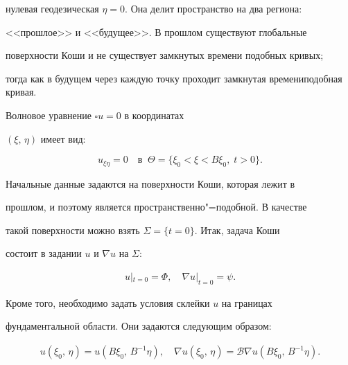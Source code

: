 нулевая геодезическая $\eta=0$. Она делит пространство на два региона:

<<прошлое>> и <<будущее>>. В прошлом существуют глобальные

поверхности Коши и не существует замкнутых времени подобных кривых;

тогда как в будущем через каждую точку проходит замкнутая времениподобная кривая.



Волновое уравнение $\square u = 0$ в координатах

$(\xi,\,\eta)$ имеет вид:

\begin{equation}

\label{gro:eq}

 u_{\xi \eta} = 0 \quad \text{в}\;\; \Theta = \{ \xi_0 < \xi

< B \xi_0,\; t > 0\}.

\end{equation}



Начальные данные задаются на поверхности Коши, которая лежит в

прошлом, и поэтому является пространственно"=подобной. В качестве

такой поверхности можно взять $\Sigma = \{t=0\}$. Итак, задача Коши

состоит в задании $u$ и $\nabla u$ на $\Sigma$:

\begin{gather}


 u |_{t=0}  = \Phi, \quad 

\label{gro:init2}

 \nabla u |_{t=0} = \psi.

\end{gather}

Кроме того, необходимо задать условия склейки $u$ на границах

фундаментальной области. Они задаются следующим образом:

\begin{gather}


 u (\xi_0,\,\eta) = u (B \xi_0,\, B^{-1}\eta),\quad 

\label{gro:glue2}

 \nabla u (\xi_0,\, \eta) = \mathcal B \nabla u (B \xi_0,\, B^{-1} \eta).

\end{gather}



